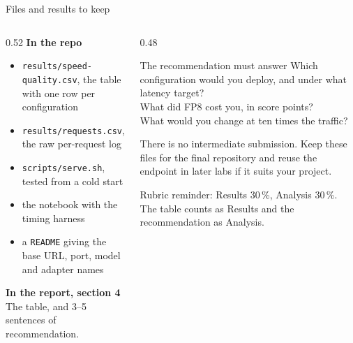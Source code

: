 \documentclass[aspectratio=169,10pt]{beamer}
\begin{document}
\fi
\begin{frame}{Files and results to keep}
  \begin{columns}[T]
    \begin{column}{0.52\textwidth}
      \textbf{In the repo}
      \begin{itemize}
        \item \texttt{results/speed-quality.csv}, the table with one row per
          configuration
        \item \texttt{results/requests.csv}, the raw per-request log
        \item \texttt{scripts/serve.sh}, tested from a cold start
        \item the notebook with the timing harness
        \item a \texttt{README} giving the base URL, port, model and adapter
          names
      \end{itemize}
      \vspace{0.5em}
      \textbf{In the report, section 4}\\
      The table, and 3--5 sentences of recommendation.
    \end{column}
    \begin{column}{0.48\textwidth}
      \begin{block}{The recommendation must answer}
        \small
        Which configuration would you deploy, and under what latency target?\\[0.3em]
        What did FP8 cost you, in score points?\\[0.3em]
        What would you change at ten times the traffic?
      \end{block}
      \vspace{0.4em}
      \small
      There is no intermediate submission. Keep these files for the final
      repository and reuse the endpoint in later labs if it suits your project.
      \vspace{0.3em}

      Rubric reminder: Results 30\,\%, Analysis 30\,\%. The table counts as
      Results and the recommendation as Analysis.
    \end{column}
  \end{columns}
\end{frame}
\end{document}
